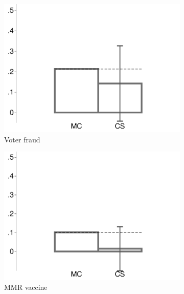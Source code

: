 \begin{figure}[t]
\begin{subfigure}{.325\textwidth}
		\includegraphics[width=\textwidth]{../figs/confidence_score_ccd_fsr_fsr_fraud_study1.pdf}
		\caption{Voter fraud}
	\end{subfigure}
	\hfill
	\begin{subfigure}{.325\textwidth}\centering
		\includegraphics[width=\textwidth]{../figs/confidence_score_ccd_fsr_fsr_mmr_study1.pdf}
		\caption{MMR vaccine}
	\end{subfigure}	
	\hfill
	\begin{subfigure}{.325\textwidth}\centering

\end{subfigure}
\end{figure}
